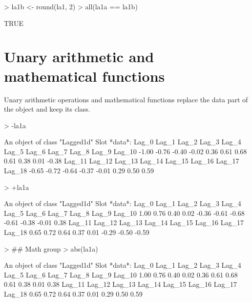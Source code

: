 \documentclass[a4paper,twoside,11pt,nojss,article]{jss}
\begin{document}
\begin{Schunk}
\begin{Sinput}
> la1b <- round(la1, 2)
> all(la1a == la1b)
\end{Sinput}
\begin{Soutput}
[1] TRUE
\end{Soutput}
\end{Schunk}




\section{Unary arithmetic and mathematical functions}
\label{sec:orgd6be8cc}

Unary arithmetic operations and mathematical functions replace the data part of the object
and keep its class.
\begin{Schunk}
\begin{Sinput}
> -la1a
\end{Sinput}
\begin{Soutput}
An object of class "Lagged1d"
Slot *data*: 
 Lag_0  Lag_1  Lag_2  Lag_3  Lag_4  Lag_5  Lag_6  Lag_7  Lag_8  Lag_9 Lag_10 
 -1.00  -0.76  -0.40  -0.02   0.36   0.61   0.68   0.61   0.38   0.01  -0.38 
Lag_11 Lag_12 Lag_13 Lag_14 Lag_15 Lag_16 Lag_17 Lag_18 
 -0.65  -0.72  -0.64  -0.37  -0.01   0.29   0.50   0.59 
\end{Soutput}
\begin{Sinput}
> +la1a
\end{Sinput}
\begin{Soutput}
An object of class "Lagged1d"
Slot *data*: 
 Lag_0  Lag_1  Lag_2  Lag_3  Lag_4  Lag_5  Lag_6  Lag_7  Lag_8  Lag_9 Lag_10 
  1.00   0.76   0.40   0.02  -0.36  -0.61  -0.68  -0.61  -0.38  -0.01   0.38 
Lag_11 Lag_12 Lag_13 Lag_14 Lag_15 Lag_16 Lag_17 Lag_18 
  0.65   0.72   0.64   0.37   0.01  -0.29  -0.50  -0.59 
\end{Soutput}
\begin{Sinput}
> ## Math group
> abs(la1a)
\end{Sinput}
\begin{Soutput}
An object of class "Lagged1d"
Slot *data*: 
 Lag_0  Lag_1  Lag_2  Lag_3  Lag_4  Lag_5  Lag_6  Lag_7  Lag_8  Lag_9 Lag_10 
  1.00   0.76   0.40   0.02   0.36   0.61   0.68   0.61   0.38   0.01   0.38 
Lag_11 Lag_12 Lag_13 Lag_14 Lag_15 Lag_16 Lag_17 Lag_18 
  0.65   0.72   0.64   0.37   0.01   0.29   0.50   0.59 
\end{Soutput}
\begin{Sinput}

\end{Sinput}
\end{Schunk}
\end{document}
